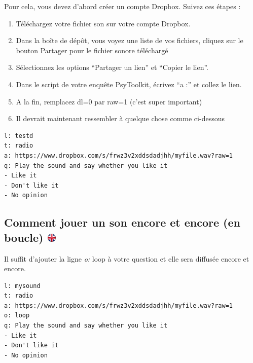 \documentclass[
]{book}
\providecommand{\tightlist}{%
  \setlength{\itemsep}{0pt}\setlength{\parskip}{0pt}}
\begin{document}
Pour cela, vous devez d'abord créer un compte Dropbox. Suivez ces étapes :

\begin{enumerate}
\def\labelenumi{\arabic{enumi}.}
\tightlist
\item
  Téléchargez votre fichier son sur votre compte Dropbox.
\item
  Dans la boîte de dépôt, vous voyez une liste de vos fichiers, cliquez sur le bouton Partager pour le fichier sonore téléchargé
\item
  Sélectionnez les options ``Partager un lien'' et ``Copier le lien''.
\item
  Dans le script de votre enquête PsyToolkit, écrivez ``a :'' et collez le lien.
\item
  A la fin, remplacez dl=0 par raw=1 (c'est super important)
\item
  Il devrait maintenant ressembler à quelque chose comme ci-dessous
\end{enumerate}

\begin{verbatim}
l: testd
t: radio
a: https://www.dropbox.com/s/frwz3v2xddsdadjhh/myfile.wav?raw=1
q: Play the sound and say whether you like it
- Like it
- Don't like it
- No opinion
\end{verbatim}

\hypertarget{comment-jouer-un-son-encore-et-encore-en-boucle}{%
\subsection[Comment jouer un son encore et encore (en boucle) ]{\texorpdfstring{Comment jouer un son encore et encore (en boucle) \href{https://www.psytoolkit.org/lessons/surveyaudiovideo.html\#_how_to_play_a_sound_again_and_again_loop}{\protect\includegraphics{img/ukflag.png}}}{Comment jouer un son encore et encore (en boucle) }}\label{comment-jouer-un-son-encore-et-encore-en-boucle}}

Il suffit d'ajouter la ligne \emph{o:} loop à votre question et elle sera diffusée encore et encore.

\begin{verbatim}
l: mysound
t: radio
a: https://www.dropbox.com/s/frwz3v2xddsdadjhh/myfile.wav?raw=1
o: loop
q: Play the sound and say whether you like it
- Like it
- Don't like it
- No opinion
\end{verbatim}
\end{document}
